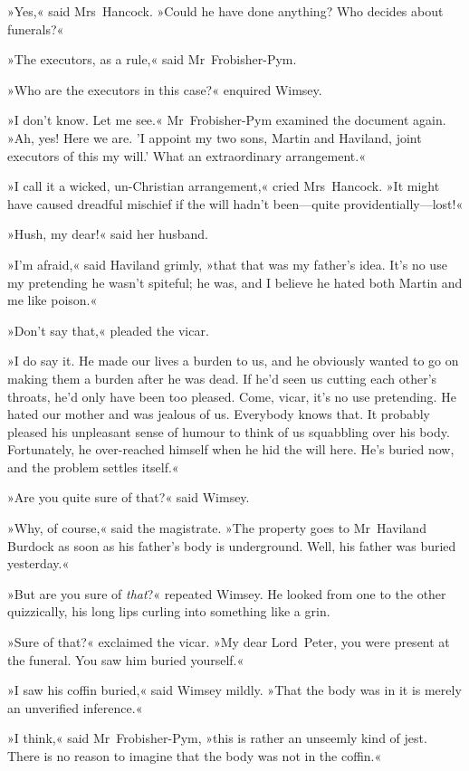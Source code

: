»Yes,« said Mrs~Hancock. »Could he have done anything? Who decides about funerals?«

»The executors, as a rule,« said Mr~Frobisher-Pym.

»Who are the executors in this case?« enquired Wimsey.

»I don't know. Let me see.« Mr~Frobisher-Pym examined the document again. »Ah, yes! Here we are. 'I appoint my two sons, Martin and Haviland, joint executors of this my will.' What an extraordinary arrangement.«

»I call it a wicked, un-Christian arrangement,« cried Mrs~Hancock. »It might have caused dreadful mischief if the will hadn't been—quite providentially—lost!«

»Hush, my dear!« said her husband.

»I'm afraid,« said Haviland grimly, »that that was my father's idea. It's no use my pretending he wasn't spiteful; he was, and I believe he hated both Martin and me like poison.«

»Don't say that,« pleaded the vicar.

»I do say it. He made our lives a burden to us, and he obviously wanted to go on making them a burden after he was dead. If he'd seen us cutting each other's throats, he'd only have been too pleased. Come, vicar, it's no use pretending. He hated our mother and was jealous of us. Everybody knows that. It probably pleased his unpleasant sense of humour to think of us squabbling over his body. Fortunately, he over-reached himself when he hid the will here. He's buried now, and the problem settles itself.«

»Are you quite sure of that?« said Wimsey.

»Why, of course,« said the magistrate. »The property goes to Mr~Haviland Burdock as soon as his father's body is underground. Well, his father was buried yesterday.«

»But are you sure of \textit{that}?« repeated Wimsey. He looked from one to the other quizzically, his long lips curling into something like a grin.

»Sure of that?« exclaimed the vicar. »My dear Lord~Peter, you were present at the funeral. You saw him buried yourself.«

»I saw his coffin buried,« said Wimsey mildly. »That the body was in it is merely an unverified inference.«

»I think,« said Mr~Frobisher-Pym, »this is rather an unseemly kind of jest. There is no reason to imagine that the body was not in the coffin.«

